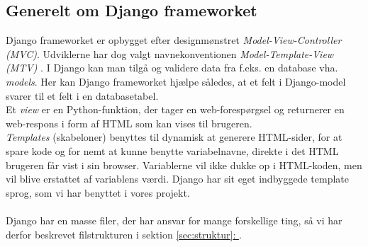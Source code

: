 \documentclass[12pt]{article}
\begin{document}
\subsection{Generelt om Django frameworket}
\label{sec:genereltdjango}
Django frameworket er opbygget efter designmønstret \textit{Model-View-Controller (MVC)}\cite{mvc}. Udviklerne har dog valgt navnekonventionen \textit{Model-Template-View (MTV)} \cite{djangoFAQ}. I Django kan man tilgå og validere data fra f.eks. en database vha. \textit{models}\cite{models}. Her kan Django frameworket hjælpe således, at et felt i Django-model svarer til et felt i en databasetabel. \\
Et \textit{view}\cite{djangoView} er en Python-funktion, der tager en web-forespørgsel og returnerer en web-respons i form af HTML som kan vises til brugeren. \\
\textit{Templates} (skabeloner) benyttes til dynamisk at generere HTML-sider, for at spare kode og for nemt at kunne benytte variabelnavne, direkte i det HTML brugeren får vist i sin browser. Variablerne vil ikke dukke op i HTML-koden, men vil blive erstattet af variablens værdi. Django har sit eget indbyggede template sprog\cite{djangoTemplate}, som vi har benyttet i vores projekt.\\
\\
Django har en masse filer, der har ansvar for mange forskellige ting, så vi har derfor beskrevet filstrukturen i sektion \hyperref[sec:struktur]{\ref*{sec:struktur}: }.
\end{document}
